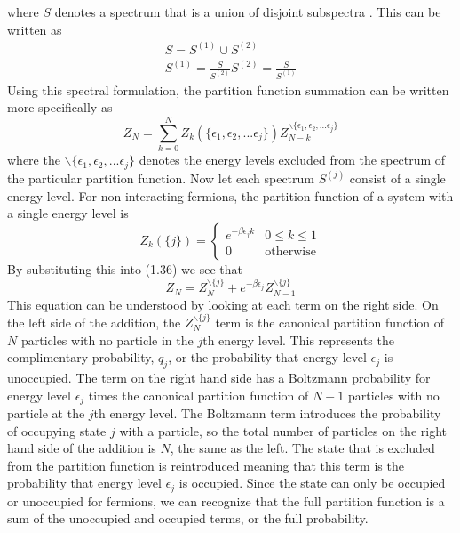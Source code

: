 where $S$ denotes a spectrum that is a union of disjoint subspectra \cite{Hatem2020}. This can be written as 
\begin{gather}
    S=S^{(1)}\cup S^{(2)}\\
    S^{(1)}=\frac{S}{S^{(2)}}
    S^{(2)}=\frac{S}{S^{(1)}}
\end{gather}
Using this spectral formulation, the partition function summation can be written more specifically as 
\begin{equation}
    Z_N=\sum_{k=0}^N Z_k(\{\epsilon_1,\epsilon_2,...\epsilon_j\})Z_{N-k}^{\backslash \{\epsilon_1,\epsilon_2,...\epsilon_j\}} 
\end{equation}
where the $\backslash \{\epsilon_1,\epsilon_2,...\epsilon_j\} $ denotes the energy levels excluded from the spectrum of the particular partition function. Now let each spectrum $S^{(j)}$ consist of a single energy level. For non-interacting fermions, the partition function of a system with a single energy level is
\begin{equation}
    Z_k(\{j\})=\begin{cases} e^{-\beta \epsilon_j k} & 0\leq k \leq 1\\0 & \text{otherwise}\end{cases}
\end{equation}
By substituting this into (1.36) we see that
\begin{equation}
    Z_N=Z_N^{\backslash\{j\}}+e^{-\beta\epsilon_j}Z_{N-1}^{\backslash\{j\}}
\end{equation}
This equation can be understood by looking at each term on the right side. On the left side of the addition, the $Z_N^{\backslash\{j\}}$ term is the canonical partition function of $N$ particles with no particle in the $j$th energy level. This represents the complimentary probability, $q_j$, or the probability that energy level $\epsilon_j$ is unoccupied. The term on the right hand side has a Boltzmann probability for energy level $\epsilon_j$ times the canonical partition function of $N-1$ particles with no particle at the $j$th energy level. The Boltzmann term introduces the probability of occupying state $j$ with a particle, so the total number of particles on the right hand side of the addition is $N$, the same as the left. The state that is excluded from the partition function is reintroduced meaning that this term is the probability that energy level $\epsilon_j$ is occupied. Since the state can only be occupied or unoccupied for fermions, we can recognize that the full partition function is a sum of the unoccupied and occupied terms, or the full probability. 

